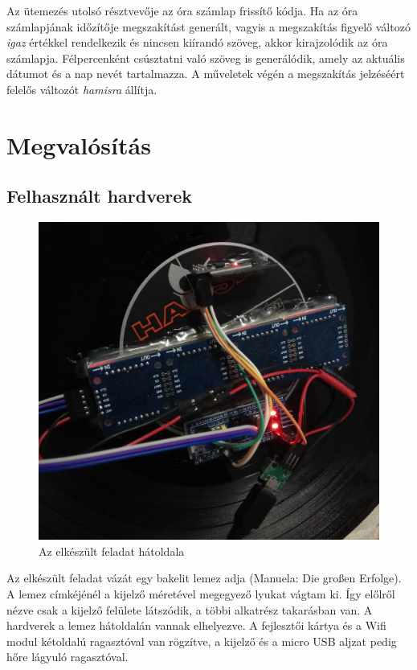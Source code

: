 \documentclass[a4paper, 12pt]{article}
\begin{document}
Az ütemezés utolsó résztvevője az óra számlap frissítő kódja. Ha az óra számlapjának időzítője megszakítást generált, vagyis a megszakítás figyelő változó \textit{igaz} értékkel rendelkezik és nincsen kiírandó szöveg, akkor kirajzolódik az óra számlapja. Félpercenként csúsztatni való szöveg is generálódik, amely az aktuális dátumot és a nap nevét tartalmazza. A műveletek végén a megszakítás jelzéséért felelős változót \textit{hamisra} állítja.

\section{Megvalósítás}
\subsection{Felhasznált hardverek}

\begin{figure}[ht]
	\centering
	\includegraphics[width = 12cm]{images/back.jpg}
	\caption{Az elkészült feladat hátoldala}
	\label{fig:back}
\end{figure}

Az elkészült feladat vázát egy bakelit lemez adja (Manuela: Die großen Erfolge). A lemez címkéjénél a kijelző méretével megegyező lyukat vágtam ki. Így előlről nézve csak a kijelző felülete látszódik, a többi alkatrész takarásban van. A hardverek a lemez hátoldalán vannak elhelyezve. A fejlesztői kártya és a Wifi modul kétoldalú ragasztóval van rögzítve, a kijelző és a micro USB aljzat pedig hőre lágyuló ragasztóval. 
\end{document}
